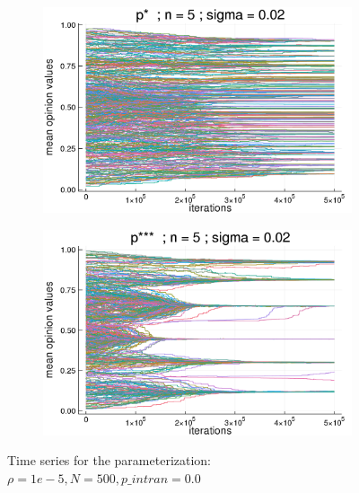 \documentclass{article}
\begin{document}
    \begin{figure}[H]
      \centering
      \begin{subfigure}[b]{0.49\textwidth}
        \includegraphics[width=\textwidth]{img/compare-ps/Poodlcalculatep*n5-rho10e-5-sigma002-00intrans.png}
      \end{subfigure}
      \begin{subfigure}[b]{0.49\textwidth}
        \includegraphics[width=\textwidth]{img/compare-ps/Poodlcalculatep***n5-rho10e-5-sigma002-00intrans.png}
      \end{subfigure}
      \caption{Time series for the parameterization: \(\rho = 1e-5, N =
        500, p\_intran = 0.0 \)}      
  \label{fig:tseries5}
    \end{figure}
\end{document}

